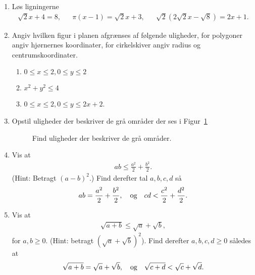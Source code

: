 \begin{enumerate}
\item Løs ligningerne
\begin{align*}
\sqrt{2}x+4=8,&& \pi(x-1)=\sqrt{2}x+3,&& \sqrt{2}(2\sqrt{2}x-\sqrt{8})=2x+1.
\end{align*}

\item Angiv hvilken figur i planen afgrænses af følgende uligheder, for polygoner angiv hjørnernes koordinater, for cirkelskiver angiv radius og centrumskoordinater.
\begin{enumerate}
	\item $ 0\leq x\leq 2, 0\leq y\leq 2 $
	\item $ x^2+y^2\leq 4 $
	\item $ 0\leq x\leq 2, 0 \leq y\leq 2x+2 $.
\end{enumerate}


\item Opstil uligheder der beskriver de grå områder der ses i Figur~\ref{fig:ligninger1}
\begin{figure}
\centering
{}
\caption{Find uligheder der beskriver de grå områder.}
\label{fig:ligninger1}
\end{figure}

\item Vis at 
\begin{align*}
ab\leq \frac{a^2}{2}+\frac{b^2}{2}.
\end{align*}
(Hint: Betragt $(a-b)^2$.)
Find derefter tal $a, b, c, d$ så
\begin{align*}
ab= \frac{a^2}{2}+\frac{b^2}{2},\quad \textup{og} \quad cd<\frac{c^2}{2}+\frac{d^2}{2}.
\end{align*}

\item Vis at
\begin{align*}
\sqrt{a+b}\leq \sqrt{a}+\sqrt{b},
\end{align*}
for $a,b\geq 0$.
(Hint: betragt $ (\sqrt{a}+\sqrt{b})^2 $). Find derefter $a,b,c,d\geq 0$ således at
\begin{align*}
\sqrt{a+b}=\sqrt{a}+\sqrt{b},\quad \textup{og}\quad \sqrt{c+d}<\sqrt{c}+\sqrt{d}.
\end{align*}

\end{enumerate}